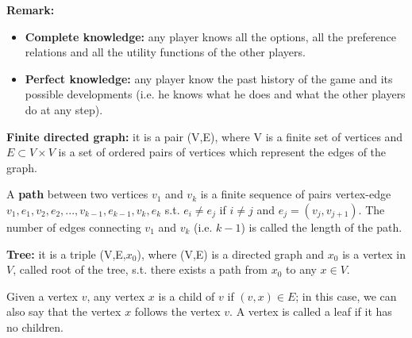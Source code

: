 
%


\noindent \textbf{Remark:}
\begin{itemize}
	\item \textbf{Complete knowledge:} any player knows all the options, all the 
	preference relations and all the utility functions of the other players.
	\item \textbf{Perfect knowledge:} any player know the past history of the 
	game and its possible developments (i.e. he knows what he does and what the 
	other players do at any step).
\end{itemize}

\noindent \textbf{Finite directed graph:} it is a pair (V,E), where V is a 
finite set of vertices and $E \subset V \times V$ is a set of ordered pairs of 
vertices which represent the edges of the graph.

\noindent A \textbf{path} between two vertices $v_1$ and $v_k$ is a finite 
sequence of pairs vertex-edge $v_1,e_1,v_2,e_2,...,v_{k-1},e_{k-1},v_k,e_k$ 
s.t. $e_i \neq e_j$ if $i \neq j$ and $e_j = (v_j,v_{j+1})$. The number of 
edges connecting $v_1$ and $v_k$ (i.e. $k-1$) is called the length of the path.

\noindent \textbf{Tree:} it is a triple (V,E,$x_0$), where (V,E) is a directed 
graph and $x_0$ is a vertex in $V$, called root of the tree, s.t. there exists 
a path from $x_0$ to any $x \in V$.

\noindent Given a vertex $v$, any vertex $x$ is a child of $v$ if $(v,x) \in E$; 
in this case, we can also say that the vertex $x$ follows the vertex $v$. 
A vertex is called a leaf if it has no children.


